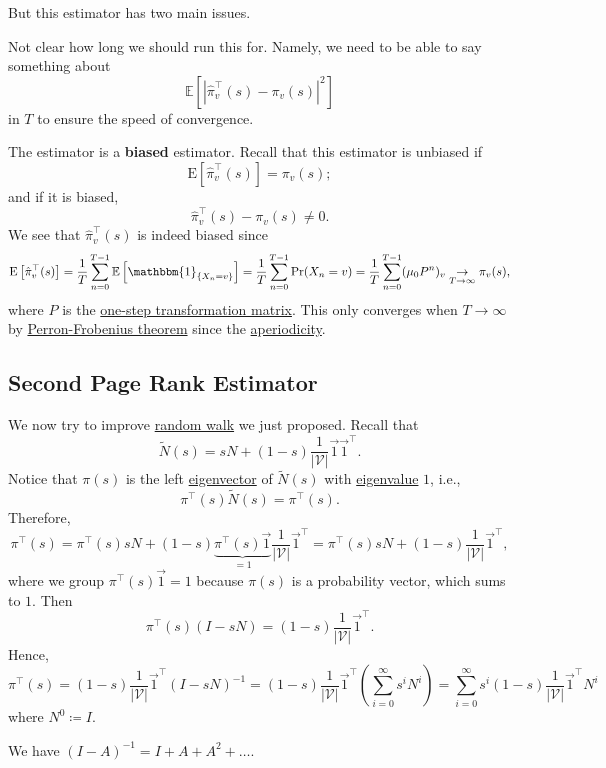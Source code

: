 But this estimator has two main issues.
\begin{problem}
Not clear how long we should run this for. Namely, we need to be able to say something about
\[
	\mathbb{E}\left[\left\vert \hat{\pi}^{\top}_v(s) - \pi_v(s) \right\vert^2 \right]
\]
in \(T\) to ensure the speed of convergence.
\end{problem}

\begin{problem}[Biased]
The estimator is a \textbf{biased} estimator. Recall that this estimator is unbiased if
\[
	\mathrm{E}\left[ \hat{\pi}_{v}^{\top}(s) \right] = \pi_v(s);
\]
and if it is biased,
\[
	\hat{\pi}_{v}^{\top}(s) - \pi_v(s)\neq 0.
\]
We see that \(\hat{\pi}^{\top}_v(s)\) is indeed biased since
\[
	\mathrm{E}\left[\hat{\pi}^{\top}_v(s)\right] = \frac{1}{T}\sum\limits_{n=0}^{T-1} \mathbb{E}\left[\mathbbm{1}_{\{X_n = v\}} \right]
	= \frac{1}{T}\sum\limits_{n=0}^{T-1} \Pr(X_n = v)
	= \frac{1}{T}\sum\limits_{n=0}^{T-1} (\mu_0 P^n)_v\underset{T\to \infty }{\to }\pi_v(s),
\]
where \(P\) is the \underline{one-step transformation matrix}. This only converges when \(T\to \infty \) by \hyperref[thm:Perron-Frobenius-theorem]{Perron-Frobenius theorem} since the \hyperref[def:aperiodic]{aperiodicity}.
\end{problem}

\subsection{Second Page Rank Estimator}\label{subsec:second-page-rank-estimator}
We now try to improve \hyperref[algo:random-walk-algorithm]{random walk} we just proposed. Recall that
\[
	\widetilde{N}(s) = sN+(1-s)\frac{1}{\left\vert \mathcal{V}  \right\vert }\vec{1}\vec{1}^{\top}.
\]
Notice that \(\pi(s)\) is the left \hyperref[def:eigenvector]{eigenvector} of \(\widetilde{N}(s)\) with \hyperref[def:eigenvalue]{eigenvalue} \(1\), i.e.,
\[
	\pi^{\top}(s)\widetilde{N}(s) = \pi^{\top}(s).
\]
Therefore,
\[
	\pi ^{\top} (s)
	= \pi^{\top}(s)sN+(1 - s)\underbrace{\pi^{\top}(s)\vec{1}}_{ = 1}\frac{1}{\left\vert \mathcal{V}\right\vert}\vec{1}^{\top}
	= \pi^{\top}(s)sN+(1 - s)\frac{1}{\left\vert \mathcal{V}  \right\vert}\vec{1}^{\top},
\]
where we group \(\pi^{\top}(s)\vec{1} = 1\) because \(\pi(s)\) is a probability vector, which sums to \(1\). Then
\[
	\pi^{\top}(s)(I - sN) = (1 - s)\frac{1}{\left\vert \mathcal{V}  \right\vert}\vec{1}^{\top}.
\]
Hence,
\[
	\pi^{\top}(s) = (1 - s)\frac{1}{\left\vert \mathcal{V}  \right\vert}\vec{1}^{\top}(I - sN)^{-1}
	= (1 - s)\frac{1}{\left\vert \mathcal{V}  \right\vert}\vec{1}^{\top}\left(\sum\limits_{i=0}^{\infty} s^i N^i\right)
	= \sum\limits_{i=0}^{\infty} s^i (1 - s)\frac{1}{\left\vert \mathcal{V}  \right\vert}\vec{1}^{\top}N^i
\]
where \(N^0\coloneqq I\).
\begin{prev}
	We have \((I - A)^{-1} = I + A + A^2 + \dots\).
\end{prev}

